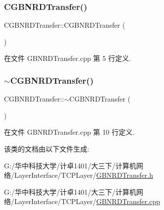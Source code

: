 \subsubsection{\texorpdfstring{C\+G\+B\+N\+R\+D\+Transfer()}{CGBNRDTransfer()}}
{\footnotesize\ttfamily C\+G\+B\+N\+R\+D\+Transfer\+::\+C\+G\+B\+N\+R\+D\+Transfer (\begin{DoxyParamCaption}{ }\end{DoxyParamCaption})}



在文件 G\+B\+N\+R\+D\+Transfer.\+cpp 第 5 行定义.

\mbox{\label{class_c_g_b_n_r_d_transfer_a4de477d40f503ddea1b4151933264fec}} 
\subsubsection{\texorpdfstring{$\sim$\+C\+G\+B\+N\+R\+D\+Transfer()}{~CGBNRDTransfer()}}
{\footnotesize\ttfamily C\+G\+B\+N\+R\+D\+Transfer\+::$\sim$\+C\+G\+B\+N\+R\+D\+Transfer (\begin{DoxyParamCaption}{ }\end{DoxyParamCaption})}



在文件 G\+B\+N\+R\+D\+Transfer.\+cpp 第 10 行定义.



该类的文档由以下文件生成\+:\begin{DoxyCompactItemize}
\item 
G\+:/华中科技大学/计卓1401/大三下/计算机网络/\+Layer\+Interface/\+T\+C\+P\+Layer/\hyperlink{_g_b_n_r_d_transfer_8h}{G\+B\+N\+R\+D\+Transfer.\+h}\item 
G\+:/华中科技大学/计卓1401/大三下/计算机网络/\+Layer\+Interface/\+T\+C\+P\+Layer/\hyperlink{_g_b_n_r_d_transfer_8cpp}{G\+B\+N\+R\+D\+Transfer.\+cpp}\end{DoxyCompactItemize}
